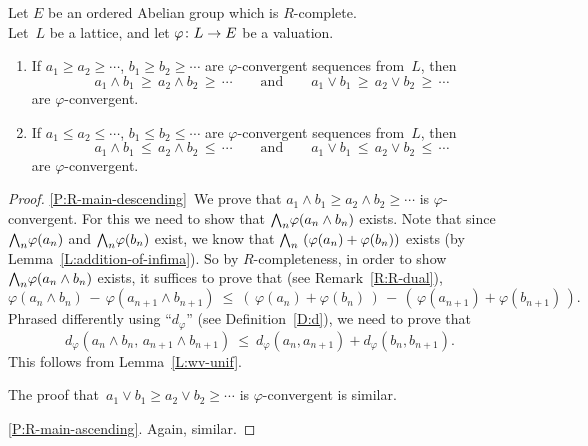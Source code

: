\documentclass[main.tex]{subfiles}
\begin{document}
\begin{prop}
\label{P:R-main}
Let  $E$ be an ordered Abelian group which is $R$-complete.\\
Let~$L$ be a lattice, and let $\varphi\colon L \rightarrow E$ be a valuation.
\begin{enumerate}
\item
\label{P:R-main-descending}
If  $a_1 \geq a_2 \geq \dotsb$,
$b_1 \geq b_2 \geq \dotsb$
are  $\varphi$-convergent
sequences from~$L$,
then
\begin{equation*}
a_1 \wedge b_1 \,\geq\, a_2 \wedge b_2 \,\geq\, \dotsb
\qquad\text{and}\qquad
a_1 \vee b_1 \,\geq\, a_2 \vee b_2 \,\geq\, \dotsb
\end{equation*}
are $\varphi$-convergent.

\item
\label{P:R-main-ascending}
If  $a_1 \leq a_2 \leq \dotsb$,
$b_1 \leq b_2 \leq \dotsb$
are  $\varphi$-convergent
sequences from~$L$,
then
\begin{equation*}
a_1 \wedge b_1 \,\leq\, a_2 \wedge b_2 \,\leq\, \dotsb
\qquad\text{and}\qquad
a_1 \vee b_1 \,\leq\, a_2 \vee b_2 \,\leq\, \dotsb
\end{equation*}
are $\varphi$-convergent.
\end{enumerate}
\end{prop}
\begin{proof}
\ref{P:R-main-descending}\ 
We prove that $a_1 \wedge b_1 \geq a_2 \wedge b_2 \geq\dotsb$
is $\varphi$-convergent.
For this we need to show that $\textstyle{\bigwedge}_n \varphi(a_n\wedge b_n)$ exists.
Note that since $\textstyle{\bigwedge}_n \varphi (a_n)$
and $\textstyle{\bigwedge}_n \varphi(b_n)$ exist,
we know that $\textstyle{\bigwedge}_n \ (\varphi(a_n) + \varphi(b_n))$
exists (by Lemma~\ref{L:addition-of-infima}).
So by $R$-completeness,
in order to show $\textstyle{\bigwedge}_n\varphi(a_n \wedge b_n)$ exists,
it suffices to prove that (see Remark~\ref{R:R-dual}),
\begin{equation*}
\varphi(a_{n}\wedge b_{n}) \,-\, \varphi(a_{n+1} \wedge b_{n+1}) 
\ \leq\ 
(\,\varphi(a_{n}) + \varphi(b_{n})\,) 
\,-\, (\,\varphi(a_{n+1}) + \varphi(b_{n+1})\,).
\end{equation*}
Phrased differently
using ``$d_\varphi$''
(see Definition~\ref{D:d}),
we need to prove that
\begin{equation*}
d_\varphi(a_{n}\wedge b_{n},\, a_{n+1} \wedge b_{n+1}) 
\ \leq\ 
d_\varphi(a_{n},a_{n+1}) + d_\varphi(b_{n},b_{n+1}).
\end{equation*}
This follows  from Lemma~\ref{L:wv-unif}.

The 
proof that~$a_1 \vee b_1 \geq a_2 \vee b_2 \geq \dotsb$
is $\varphi$-convergent is similar.

\ref{P:R-main-ascending}.  Again, similar.
\end{proof}
\end{document}
